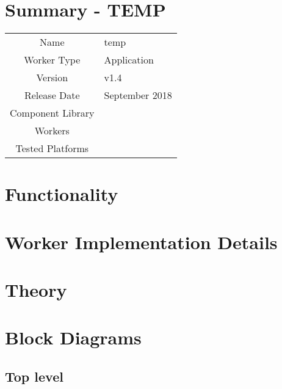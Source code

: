 \documentclass{article}
\author{} %
\date{Version \docVersion} %
\title{\docTitle}
\def\docVersion{1.4}
\def\comp{temp}
\def\Comp{TEMP}
\begin{document}
\section*{Summary - \Comp}
\begin{tabular}{|c|M{13.5cm}|}
	\hline
	                  &                                                                                \\
	\hline
	Name              & \comp                                                                          \\
	\hline
	Worker Type       & Application                                                                    \\
	\hline
	Version           &  v\docVersion \\
	\hline
	Release Date      &  September 2018 \\
	\hline
	Component Library &   \\
	\hline
	Workers           &  \\
	\hline
	Tested Platforms  &  \\
	\hline
\end{tabular}

\section*{Functionality}
\begin{flushleft}
\end{flushleft}

\section*{Worker Implementation Details}
\begin{flushleft}
\end{flushleft}

\section*{Theory}
\begin{flushleft}
\end{flushleft}

\section*{Block Diagrams}
\subsection*{Top level}
\begin{center}
\end{center}\pagebreak
\end{document}

